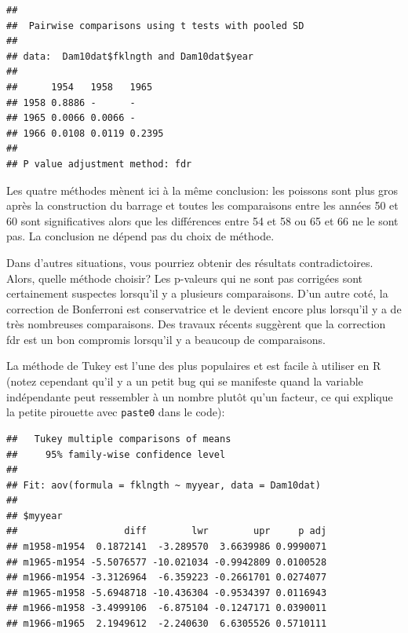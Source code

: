 \documentclass[12pt,]{book}
\newenvironment{Shaded}{\begin{snugshade}}{\end{snugshade}}
\newcommand{\DataTypeTok}[1]{\textcolor[rgb]{0.27,0.27,0.27}{#1}}
\newcommand{\KeywordTok}[1]{\textcolor[rgb]{0.27,0.27,0.27}{\textbf{#1}}}
\newcommand{\NormalTok}[1]{#1}
\newcommand{\OperatorTok}[1]{\textcolor[rgb]{0.43,0.43,0.43}{\textbf{#1}}}
\newcommand{\StringTok}[1]{\textcolor[rgb]{0.5,0.5,0.5}{#1}}
\begin{document}
\begin{verbatim}
## 
## 	Pairwise comparisons using t tests with pooled SD 
## 
## data:  Dam10dat$fklngth and Dam10dat$year 
## 
##      1954   1958   1965  
## 1958 0.8886 -      -     
## 1965 0.0066 0.0066 -     
## 1966 0.0108 0.0119 0.2395
## 
## P value adjustment method: fdr
\end{verbatim}

Les quatre méthodes mènent ici à la même conclusion: les poissons sont plus gros après la construction du barrage et toutes les comparaisons entre les années 50 et 60 sont significatives alors que les différences entre 54 et 58 ou 65 et 66 ne le sont pas. La conclusion ne dépend pas du choix de méthode.

Dans d'autres situations, vous pourriez obtenir des résultats contradictoires. Alors, quelle méthode choisir? Les p-valeurs qui ne sont pas corrigées sont certainement suspectes lorsqu'il y a plusieurs comparaisons. D'un autre coté, la correction de Bonferroni est conservatrice et le devient encore plus lorsqu'il y a de très nombreuses comparaisons. Des travaux récents suggèrent que la correction fdr est un bon compromis lorsqu'il y a beaucoup de comparaisons.

La méthode de Tukey est l'une des plus populaires et est facile à utiliser en R (notez cependant qu'il y a un petit bug qui se manifeste quand la variable indépendante peut ressembler à un nombre plutôt qu'un facteur, ce qui explique la petite pirouette avec \texttt{paste0} dans le code):

\begin{Shaded}
\end{Shaded}

\begin{verbatim}
##   Tukey multiple comparisons of means
##     95% family-wise confidence level
## 
## Fit: aov(formula = fklngth ~ myyear, data = Dam10dat)
## 
## $myyear
##                   diff        lwr        upr     p adj
## m1958-m1954  0.1872141  -3.289570  3.6639986 0.9990071
## m1965-m1954 -5.5076577 -10.021034 -0.9942809 0.0100528
## m1966-m1954 -3.3126964  -6.359223 -0.2661701 0.0274077
## m1965-m1958 -5.6948718 -10.436304 -0.9534397 0.0116943
## m1966-m1958 -3.4999106  -6.875104 -0.1247171 0.0390011
## m1966-m1965  2.1949612  -2.240630  6.6305526 0.5710111
\end{verbatim}
\end{document}
